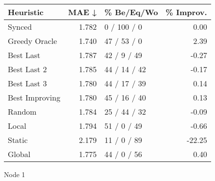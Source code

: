 \begin{tabular}{lrlr}
\toprule
\textbf{Heuristic} & \textbf{MAE ↓} & \textbf{\% Be/Eq/Wo} & \textbf{\% Improv.} \\
\midrule
            Synced &          1.782 &          0 / 100 / 0 &                0.00 \\
     Greedy Oracle &          1.740 &          47 / 53 / 0 &                2.39 \\
         Best Last &          1.787 &          42 / 9 / 49 &               -0.27 \\
       Best Last 2 &          1.785 &         44 / 14 / 42 &               -0.17 \\
       Best Last 3 &          1.780 &         44 / 17 / 39 &                0.14 \\
    Best Improving &          1.780 &         45 / 16 / 40 &                0.13 \\
            Random &          1.784 &         25 / 44 / 32 &               -0.09 \\
             Local &          1.794 &          51 / 0 / 49 &               -0.66 \\
            Static &          2.179 &          11 / 0 / 89 &              -22.25 \\
            Global &          1.775 &          44 / 0 / 56 &                0.40 \\
\bottomrule
\end{tabular}
\caption{Node 1}
\label{tab:ds_iid_lr05_le1_bs4_1}
